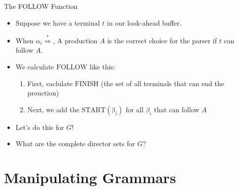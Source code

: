 \documentclass[]{beamer}
\begin{document}
\begin{frame}{The FOLLOW Function}
  \begin{itemize}[<+->]
    \item Suppose we have a terminal $t$ in our look-ahead buffer.
    \item When $\alpha_i \stackrel{*}{\Rightarrow}$, A production $A$ is the correct choice for the parser if $t$ can follow $A$.
    \item We calculate $\mathrm{FOLLOW}$ like this:
    \begin{enumerate}
      \item First, caclulate $\mathrm{FINISH}$ (the set of all terminals that can end the prouction)
      \item Next, we add the $\mathrm{START(\beta_i)}$ for all $\beta_i$ that can follow $A$
    \end{enumerate}
    \item Let's do this for $G$!
    \item What are the complete director sets for $G$?
  \end{itemize}
\end{frame}

\section{Manipulating Grammars}
\end{document}
